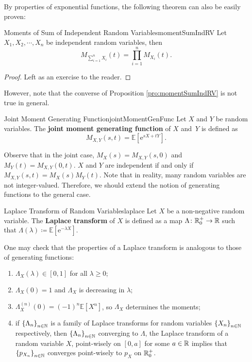 \documentclass[math]{amznotes}
\theoremstyle{remark}
\newcommand{\0}{\mathbf{0}}
\newcommand{\1}{\mathbf{1}}
\newcommand{\e}{\mathrm{e}}
\begin{document}
By properties of exponential functions, the following theorem can also be easily proven:
\begin{probox}{\small Moments of Sum of Independent Random Variables}{momentSumIndRV}
    Let $X_1, X_2, \cdots, X_n$ be independent random variables, then 
    \begin{equation*}
        M_{\sum_{i = 1}^{n}X_i}(t) = \prod_{i = 1}^{n}M_{X_i}(t).
    \end{equation*}
    \tcblower
    \begin{proof}
        Left as an exercise to the reader.
    \end{proof}
\end{probox}
However, note that the converse of Proposition \ref{pro:momentSumIndRV} is not true in general.
\begin{dfnbox}{Joint Moment Generating Function}{jointMomentGenFunc}
    Let $X$ and $Y$ be random variables. The {\color{red} \textbf{joint moment generating function}} of $X$ and~$Y$ is defined as
    \begin{equation*}
        M_{X, Y}(s, t) = \mathbb{E}\left[\e^{sX + tY}\right].
    \end{equation*}
\end{dfnbox}
Observe that in the joint case, $M_X(s) = M_{X, Y}(s, 0)$ and $M_Y(t) = M_{X, Y}(0, t)$. $X$ and $Y$ are independent if and only if $M_{X, Y}(s, t) = M_X(s)M_Y(t)$.
Note that in reality, many random variables are not integer-valued. Therefore, we should extend the notion of generating functions to the general case.
\begin{dfnbox}{Laplace Transform of Random Variables}{laplace}
    Let $X$ be a non-negative random variable. The {\color{red} \textbf{Laplace transform}} of $X$ is defined as a map $\Lambda \colon \mathbb{R}^+_0 \to \mathbb{R}$ such that $\Lambda\left(\lambda\right) \coloneqq \mathbb{E}\left[\e^{-\lambda X}\right]$.  
\end{dfnbox}
One may check that the properties of a Laplace transform is analogous to those of generating functions:
\begin{enumerate}
    \item $\Lambda_X\left(\lambda\right) \in \left[0, 1\right]$ for all $\lambda \geq 0$;
    \item $\Lambda_X\left(0\right) = 1$ and $\Lambda_X$ is decreasing in $\lambda$;
    \item $\Lambda^{(n)}_X\left(0\right) = \left(-1\right)^n\mathbb{E}\left[X^n\right]$, so $\Lambda_X$ determines the moments;
    \item if $\left\{\Lambda_n\right\}_{n \in \mathbb{N}}$ is a family of Laplace transforms for random variables $\left\{X_n\right\}_{n \in \mathbb{N}}$ respectively, then $\left\{\Lambda_n\right\}_{n \in \mathbb{N}}$ converging to $\Lambda$, the Laplace transform of a random variable $X$, point-wisely on $\left[0, a\right]$ for some $a \in \mathbb{R}$ implies that $\left\{p_{X_n}\right\}_{n \in \mathbb{N}}$ converges point-wisely to $p_X$ on $\mathbb{R}^+_0$.
\end{enumerate}
\end{document}
